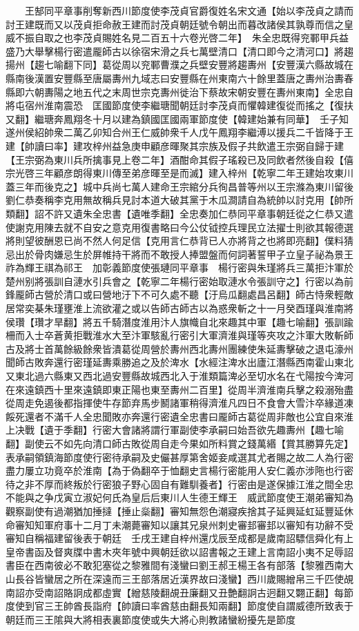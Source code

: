 　　王郜同平章事削奪新西川節度使李茂貞官爵復姓名宋文通【始以李茂貞之請而討王建既而又以茂貞拒命赦王建而討茂貞朝廷號令朝出而暮改諸侯其孰尊而信之皇威不振自取之也李茂貞賜姓名見二百五十六卷光啓二年】　朱全忠既得兖鄆甲兵益盛乃大舉擊楊行密遣龎師古以徐宿宋滑之兵七萬壁清口【清口即今之清河口】將趨揚州【趨七喻翻下同】葛從周以兖鄆曹濮之兵壁安豐將趨夀州【安豐漢六縣故城在縣南後漢置安豐縣至唐屬夀州九域志曰安豐縣在州東南六十餘里蓋唐之夀州治夀春縣即六朝夀陽之地五代之末周世宗克夀州徙治下蔡故宋朝安豐在夀州東南】全忠自將屯宿州淮南震恐　匡國節度使李繼瑭聞朝廷討李茂貞而懼韓建復從而搖之【復扶又翻】繼瑭奔鳳翔冬十月以建為鎮國匡國兩軍節度使【韓建始兼有同華】　壬子知遂州侯紹帥衆二萬乙卯知合州王仁威帥衆千人戊午鳳翔李繼溥以援兵二千皆降于王建【帥讀曰率】建攻梓州益急庚申顧彦暉聚其宗族及假子共飲遣王宗弼自歸于建【王宗弼為東川兵所擒事見上卷二年】酒酣命其假子瑤殺已及同飲者然後自殺【僖宗光啓三年顧彦朗得東川傳至弟彦暉至是而滅】建入梓州【乾寧二年王建始攻東川蓋三年而後克之】城中兵尚七萬人建命王宗綰分兵徇昌普等州以王宗滌為東川留後　劉仁恭奏稱李克用無故稱兵見討本道大破其黨于木瓜澗請自為統帥以討克用【帥所類翻】詔不許又遺朱全忠書【遺唯季翻】全忠奏加仁恭同平章事朝廷從之仁恭又遣使謝克用陳去就不自安之意克用復書略曰今公仗钺控兵理民立法擢士則欲其報德選將則望彼酬恩已尚不然人何足信【克用言仁恭背已人亦將背之也將即亮翻】僕料猜忌出於骨肉嫌忌生於屏帷持干將而不敢授人捧盟盤而何詞著誓甲子立皇子祕為景王祚為輝王祺為祁王　加彰義節度使張璉同平章事　楊行密與朱瑾將兵三萬拒汴軍於楚州别將張訓自漣水引兵會之【乾寧二年楊行密始取漣水令張訓守之】行密以為前鋒龎師古營於清口或曰營地汙下不可久處不聽【汙烏瓜翻處昌呂翻】師古恃衆輕敵居常奕棊朱瑾壅淮上流欲灌之或以告師古師古以為惑衆斬之十一月癸酉瑾與淮南將侯瓚【瓚才旱翻】將五千騎潛度淮用汴人旗幟自北來趣其中軍【趣七喻翻】張訓踰柵而入士卒蒼黄拒戰淮水大至汴軍駭亂行密引大軍濟淮與瑾等夾攻之汴軍大敗斬師古及將士首萬餘級餘衆皆潰葛從周營於夀州西北夀州團練使朱延夀擊破之退屯濠州聞師古敗奔還行密瑾延夀乘勝追之及於渒水【水經注渒水出廬江潛縣西南霍山東北又東北過六縣東又西北過安豐縣故城西北入于淮類篇渒必至切水名在弋陽按今渒河在來遠鎮西十里來遠鎮即東正陽也東至夀州二百里】從周半濟淮南兵擊之殺溺殆盡從周走免遏後都指揮使牛存節弃馬步鬭諸軍稍得濟淮凡四日不食會大雪汴卒緣道凍餒死還者不滿千人全忠聞敗亦奔還行密遺全忠書曰龎師古葛從周非敵也公宜自來淮上决戰【遺于季翻】行密大會諸將謂行軍副使李承嗣曰始吾欲先趣夀州【趣七喻翻】副使云不如先向清口師古敗從周自走今果如所料賞之錢萬緡【賞其勝算先定】表承嗣領鎮海節度使行密待承嗣及史儼甚厚第舍姬妾咸選其尤者賜之故二人為行密盡力屢立功竟卒於淮南【為于偽翻卒于恤翻史言楊行密能用人安仁義亦涉陁也行密待之非不厚而終叛於行密狼子野心固自有難馴養者】行密由是遂保據江淮之間全忠不能與之争戊寅立淑妃何氏為皇后后東川人生德王輝王　威武節度使王潮弟審知為觀察副使有過潮猶加捶撻【捶止橤翻】審知無怨色潮寢疾捨其子延興延虹延豐延休命審知知軍府事十二月丁未潮薨審知以讓其兄泉州刺史審邽審邽以審知有功辭不受審知自稱福建留後表于朝廷　壬戌王建自梓州還戊辰至成都是歲南詔驃信舜化有上皇帝書函及督爽牒中書木夾年號中興朝廷欲以詔書報之王建上言南詔小夷不足辱詔書臣在西南彼必不敢犯塞從之黎雅間有淺蠻曰劉王郝王楊王各有部落【黎雅西南大山長谷皆蠻居之所在深遠而三王部落居近漢界故曰淺蠻】西川歲賜繒帛三千匹使覘南詔亦受南詔賂詗成都虛實【繒慈陵翻覘丑廉翻又丑艶翻詗古迥翻又翾正翻】每節度使到官三王帥酋長詣府【帥讀曰率酋慈由翻長知兩翻】節度使自謂威德所致表于朝廷而三王隂與大將相表裏節度使或失大將心則教諸蠻紛擾先是節度